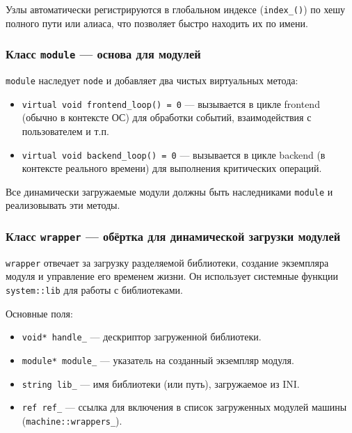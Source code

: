 \documentclass[a4paper,12pt]{article}
\begin{document}
Узлы автоматически регистрируются в глобальном индексе (\texttt{index\_()}) по хешу полного пути или алиаса, что позволяет быстро находить их по имени.

\subsubsection{Класс \texttt{module} — основа для модулей}

\texttt{module} наследует \texttt{node} и добавляет два чистых виртуальных метода:

\begin{itemize}
    \item \texttt{virtual void frontend\_loop() = 0} — вызывается в цикле frontend (обычно в контексте ОС) для обработки событий, взаимодействия с пользователем и т.п.
    \item \texttt{virtual void backend\_loop() = 0} — вызывается в цикле backend (в контексте реального времени) для выполнения критических операций.
\end{itemize}

Все динамически загружаемые модули должны быть наследниками \texttt{module} и реализовывать эти методы.

\subsubsection{Класс \texttt{wrapper} — обёртка для динамической загрузки модулей}

\texttt{wrapper} отвечает за загрузку разделяемой библиотеки, создание экземпляра модуля и управление его временем жизни. Он использует системные функции \texttt{system::lib} для работы с библиотеками.

Основные поля:
\begin{itemize}
    \item \texttt{void* handle\_} — дескриптор загруженной библиотеки.
    \item \texttt{module* module\_} — указатель на созданный экземпляр модуля.
    \item \texttt{string lib\_} — имя библиотеки (или путь), загружаемое из INI.
    \item \texttt{ref ref\_} — ссылка для включения в список загруженных модулей машины (\texttt{machine::wrappers\_}).
\end{itemize}
\end{document}
